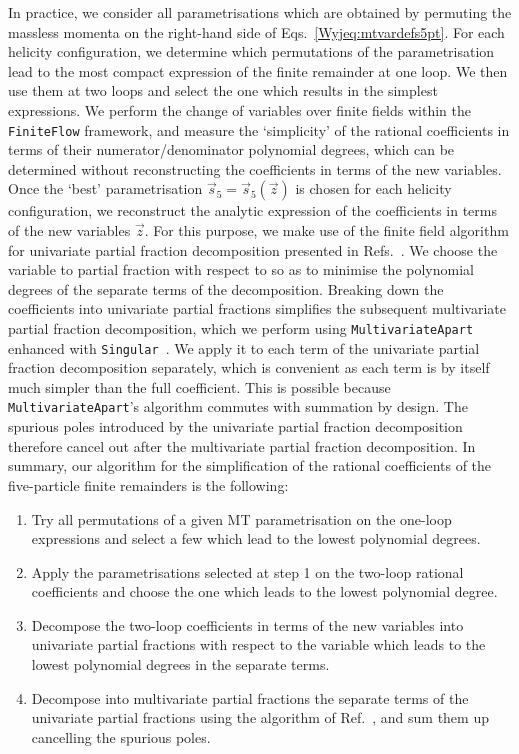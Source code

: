\documentclass[main.tex]{subfiles}
\begin{document}
In practice, we consider all parametrisations which are obtained by permuting the massless momenta on the right-hand side of Eqs.~\ref{Wyjeq:mtvardefs5pt}. For each helicity configuration, we determine which permutations of the parametrisation lead to the most compact expression of the finite remainder at one loop. We then use them at two loops and select the one which results in the simplest expressions. We perform the change of variables over finite fields within the \texttt{FiniteFlow} framework, and measure the `simplicity' of the rational coefficients in terms of their numerator/denominator polynomial degrees, which can be determined without reconstructing the coefficients in terms of the new variables. Once the `best' parametrisation $\vec{s}_5 = \vec{s}_5 (\vec{z})$ is chosen for each helicity configuration, we reconstruct the analytic expression of the coefficients in terms of the new variables $\vec{z}$. For this purpose, we make use of the finite field algorithm for univariate partial fraction decomposition presented in Refs.~\cite{Badger:2021nhg,Badger:2021imn}. We choose the variable to partial fraction with respect to so as to minimise the polynomial degrees of the separate terms of the decomposition. Breaking down the coefficients into univariate partial fractions simplifies the subsequent multivariate partial fraction decomposition, which we perform using \texttt{MultivariateApart}~\cite{Heller:2021qkz} enhanced with \texttt{Singular}~\cite{DGPS}. We apply it to each term of the univariate partial fraction decomposition separately, which is convenient as each term is by itself much simpler than the full coefficient. This is possible because \texttt{MultivariateApart}'s algorithm commutes with summation by design. The spurious poles introduced by the univariate partial fraction decomposition therefore cancel out after the multivariate partial fraction decomposition. In summary, our algorithm for the simplification of the rational coefficients of the five-particle finite remainders is the following:
\begin{enumerate}
\item Try all permutations of a given MT parametrisation on the one-loop expressions and select a few which lead to the lowest polynomial degrees.
\item Apply the parametrisations selected at step 1 on the two-loop rational coefficients and choose the one which leads to the lowest polynomial degree.
\item Decompose the two-loop coefficients in terms of the new variables into univariate partial fractions with respect to the variable which leads to the lowest polynomial degrees in the separate terms.
\item Decompose into multivariate partial fractions the separate terms of the univariate partial fractions using the algorithm of Ref.~\cite{Heller:2021qkz}, and sum them up cancelling the spurious poles.
\end{enumerate}
\end{document}
